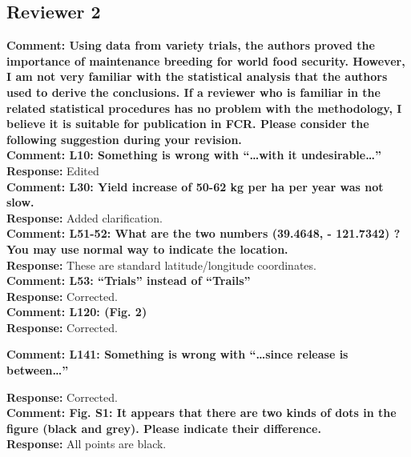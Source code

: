 \documentclass{article} \usepackage[margin=1in]{geometry}
\begin{document}
\subsection{Reviewer 2}

\textbf{Comment: Using data from variety trials, the authors proved the importance of
  maintenance breeding for world food security. However, I am not very
  familiar with the statistical analysis that the authors used to derive
  the conclusions. If a reviewer who is familiar in the related
  statistical procedures has no problem with the methodology, I believe
  it is suitable for publication in FCR. Please consider the following
  suggestion during your revision.}\\


\textbf{Comment: L10: Something is wrong with “…with it undesirable…”}\\

\textbf{Response:} Edited\\

\textbf{Comment: L30: Yield increase of 50-62 kg per ha per year was not slow.}\\

\textbf{Response:} Added clarification.\\

\textbf{Comment: L51-52: What are the two numbers (39.4648, - 121.7342) ? You may use
normal way to indicate the location.}\\

\textbf{Response:} These are standard latitude/longitude coordinates.\\

\textbf{Comment: L53: “Trials” instead of “Trails”}\\

\textbf{Response:} Corrected.\\

\textbf{Comment: L120: (Fig. 2)}\\

\textbf{Response:} Corrected.

\textbf{Comment: L141: Something is wrong with “…since release is between…”}

\textbf{Response:} Corrected.\\

\textbf{Comment: Fig. S1: It appears that there are two kinds of dots in the figure
(black and grey). Please indicate their difference.}\\

\textbf{Response:} All points are black.\\

\newpage



\newpage


\end{document}

